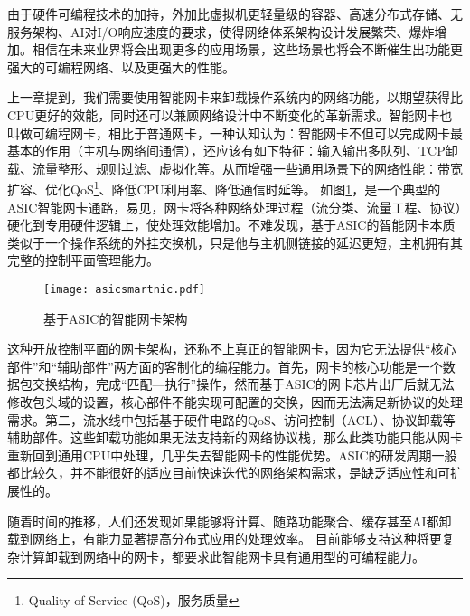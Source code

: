 由于硬件可编程技术的加持，外加比虚拟机更轻量级的容器、高速分布式存储、无服务架构、AI对I/O响应速度的要求，使得网络体系架构设计发展繁荣、爆炸增加。相信在未来业界将会出现更多的应用场景，这些场景也将会不断催生出功能更强大的可编程网络、以及更强大的性能。








上一章提到，我们需要使用智能网卡来卸载操作系统内的网络功能，以期望获得比CPU更好的效能，同时还可以兼顾网络设计中不断变化的革新需求。智能网卡也叫做可编程网卡，相比于普通网卡，一种认知认为：智能网卡不但可以完成网卡最基本的作用（主机与网络间通信），还应该有如下特征：输入输出多队列、TCP卸载、流量整形、规则过滤、虚拟化等。从而增强一些通用场景下的网络性能：带宽扩容、优化QoS\footnote{Quality of Service (QoS)，服务质量}、降低CPU利用率、降低通信时延等。
如图\ref{fig:asicsmartnic}，是一个典型的ASIC智能网卡通路，易见，网卡将各种网络处理过程（流分类、流量工程、协议）硬化到专用硬件逻辑上，使处理效能增加。不难发现，基于ASIC的智能网卡本质类似于一个操作系统的外挂交换机，只是他与主机侧链接的延迟更短，主机拥有其完整的控制平面管理能力。

\begin{figure}[!ht]
	\centering
	\texttt{[image: asicsmartnic.pdf]}
	\caption{基于ASIC的智能网卡架构} \label{fig:asicsmartnic}
\end{figure}

这种开放控制平面的网卡架构，还称不上真正的智能网卡，因为它无法提供“核心部件”和“辅助部件”两方面的客制化的编程能力。首先，网卡的核心功能是一个数据包交换结构，完成“匹配---执行”操作，然而基于ASIC的网卡芯片出厂后就无法修改包头域的设置，核心部件不能实现可配置的交换，因而无法满足新协议的处理需求。第二，流水线中包括基于硬件电路的QoS、访问控制（ACL）、协议卸载等辅助部件。这些卸载功能如果无法支持新的网络协议栈，那么此类功能只能从网卡重新回到通用CPU中处理，几乎失去智能网卡的性能优势。ASIC的研发周期一般都比较久，并不能很好的适应目前快速迭代的网络架构需求，是缺乏适应性和可扩展性的。

随着时间的推移，人们还发现如果能够将计算、随路功能聚合、缓存甚至AI都卸载到网络上，有能力显著提高分布式应用的处理效率。%
目前能够支持这种将更复杂计算卸载到网络中的网卡，都要求此智能网卡具有通用型的可编程能力。

